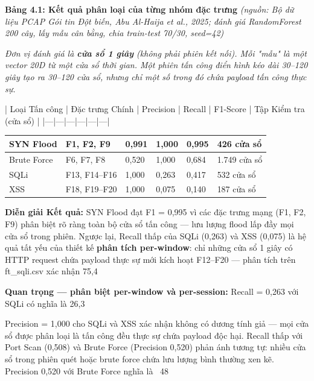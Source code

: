 \documentclass[12pt,a4paper,twoside]{report}
\begin{document}
{{\textbf{Bảng 4.1: Kết quả phân loại của từng nhóm đặc trưng} \textit{(nguồn: Bộ dữ liệu PCAP Gói tin Đột biến, Abu Al-Haija et al., 2025; đánh giá RandomForest 200 cây, lấy mẫu cân bằng, chia train-test 70/30, seed=42)}

\textit{Đơn vị đánh giá là \textbf{cửa sổ 1 giây} (không phải phiên kết nối). Mỗi "mẫu" là một vector 20D từ một cửa sổ thời gian. Một phiên tấn công điển hình kéo dài 30–120 giây tạo ra 30–120 cửa sổ, nhưng chỉ một số trong đó chứa payload tấn công thực sự.}

| Loại Tấn công | Đặc trưng Chính | Precision | Recall | F1-Score | Tập Kiểm tra (cửa sổ) |
|---|---|---|---|---|---|


\begin{tabular}{p{2.5cm}p{2.5cm}p{2.5cm}p{2.5cm}p{2.5cm}p{2.5cm}}
\hline
SYN Flood & F1, F2, F9 & 0,991 & 1,000 & 0,995 & 426 cửa sổ \\
\hline
Brute Force & F6, F7, F8 & 0,520 & 1,000 & 0,684 & 1.749 cửa sổ \\
SQLi & F13, F14–F16 & 1,000 & 0,263 & 0,417 & 532 cửa sổ \\
XSS & F18, F19–F20 & 1,000 & 0,075 & 0,140 & 187 cửa sổ \\
\hline
\end{tabular}

\textbf{Diễn giải Kết quả:} SYN Flood đạt F1 = 0,995 vì các đặc trưng mạng (F1, F2, F9) phân biệt rõ ràng toàn bộ cửa sổ tấn công — lưu lượng flood lấp đầy mọi cửa sổ trong phiên. Ngược lại, Recall thấp của SQLi (0,263) và XSS (0,075) là hệ quả tất yếu của thiết kế \textbf{phân tích per-window}: chỉ những cửa sổ 1 giây có HTTP request chứa payload thực sự mới kích hoạt F12–F20 — phân tích trên ft_sqli.csv xác nhận 75,4%

\textbf{Quan trọng — phân biệt per-window và per-session:} Recall = 0,263 với SQLi có nghĩa là 26,3%

Precision = 1,000 cho SQLi và XSS xác nhận không có dương tính giả — mọi cửa sổ được phân loại là tấn công đều thực sự chứa payload độc hại. Recall thấp với Port Scan (0,508) và Brute Force (Precision 0,520) phản ánh tương tự: nhiều cửa sổ trong phiên quét hoặc brute force chứa lưu lượng bình thường xen kẽ. Precision 0,520 với Brute Force nghĩa là ~48%

}}
\end{document}
